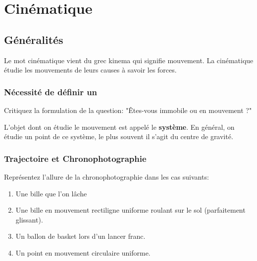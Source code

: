 \setcounter{chapter}{3}
\chapter{Cinématique}
\section{Généralités}

Le mot cinématique vient du grec kinema qui signifie mouvement. La cinématique étudie les mouvements  de leurs causes à savoir les forces.

\subsection{Nécessité de définir un }

Critiquez la formulation de la question: "Êtes-vous immobile ou en mouvement ?" \\



L'objet dont on étudie le mouvement est appelé le \textbf{système}. En général, on étudie un point de ce système, le plus souvent il s'agit du centre de gravité.
\subsection{Trajectoire et Chronophotographie}


Représentez l'allure de la chronophotographie dans les cas suivants:
\begin{enumerate}
	\item Une bille que l'on lâche
	\item Une bille en mouvement rectiligne uniforme roulant sur le sol (parfaitement glissant).
	\item Un ballon de basket lors d'un lancer franc.
	\item Un point en mouvement circulaire uniforme.
\end{enumerate}
\vspace{6 cm}


